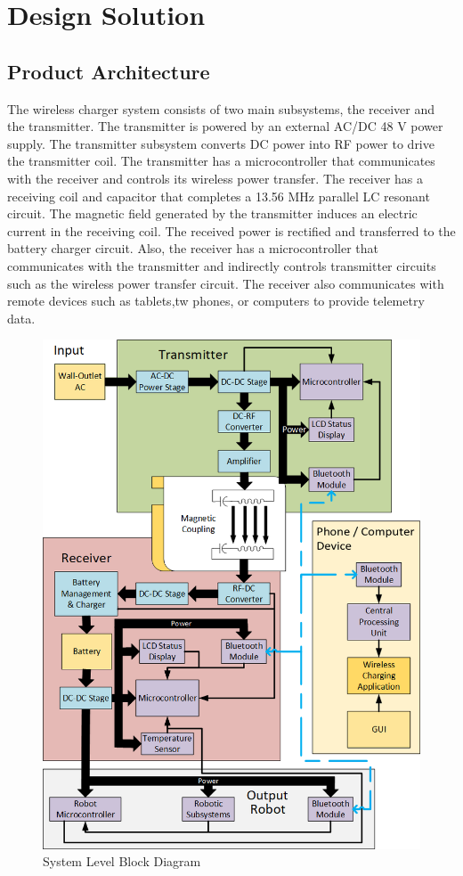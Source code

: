 \documentclass[12pt]{article}
\begin{document}
\pagebreak


\section{Design Solution}

\subsection{Product Architecture}

\indent \indent
The wireless charger system consists of two main subsystems, the receiver and the transmitter.  The transmitter is powered by an external AC/DC 48 V power supply. The transmitter subsystem converts DC power into RF power to drive the transmitter coil. The transmitter has a microcontroller that communicates with the receiver and controls its wireless power transfer.  The receiver has a receiving coil and capacitor that completes a 13.56 MHz parallel LC resonant circuit. The magnetic field generated by the transmitter induces an electric current in the receiving coil. The received power is rectified and transferred to the battery charger circuit. Also, the receiver has a microcontroller that communicates with the transmitter and indirectly controls transmitter circuits such as the wireless power transfer circuit. The receiver also communicates with remote devices such as tablets,tw phones, or computers to provide telemetry data. \\ 

\hfill
\pagebreak


\begin{figure}[h!]
\centering
\includegraphics[width=0.88\linewidth]{total_diagram}
\caption{System Level Block Diagram}
\end{figure}
\end{document}
